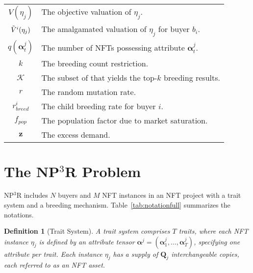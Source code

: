 \documentclass[conference]{IEEEtran}
\theoremstyle{plain}
\newtheorem{definition}{Definition}
\begin{document}
\begin{table}
\begin{tabular}{c|p{.7\linewidth}}
    $V(\eta_j)$ & The objective valuation of $\eta_j$.\\
    $\Tilde{V}^i(\eta_j)$ & The amalgamated valuation of $\eta_j$ for buyer $b_i$.\\
    $q(\bm{\alpha}^j_t)$ & The number of NFTs possessing attribute $\bm{\alpha}^j_t$. \\
    $k$ & The breeding count restriction.\\
    $\mathcal{K}$ & The subset of that yields the top-$k$ breeding results.\\
    $r$ & The random mutation rate.\\
    $r_{breed}^i$ & The child breeding rate for buyer $i$.\\
    $f_{pop}$ & The population factor due to market saturation. \\

    $\mathbf{z}$ & The excess demand.\\

    \bottomrule
    \end{tabular}
\end{table} 

\section{The \texorpdfstring{NP$^3$R }{NP3R} Problem}
\label{sec:the-problem}
    NP$^3$R includes $N$ buyers and $M$ NFT instances in an NFT project with a trait system and a breeding mechanism.
    Table~\ref{tab:notationfull} summarizes the notations.

\begin{definition}[Trait System]
\label{def:nft-trait-system}
A trait system comprises $T$ traits, where each NFT instance $\eta_j$ is defined by an attribute tensor $\bm{\alpha}^j = (\bm{\alpha}^j_1, \ldots, \bm{\alpha}^j_T)$, specifying one attribute per trait. Each instance $\eta_j$ has a supply of $\mathbf{Q}_j$ interchangeable copies, each referred to as an NFT asset.
\end{definition}
\end{document}
